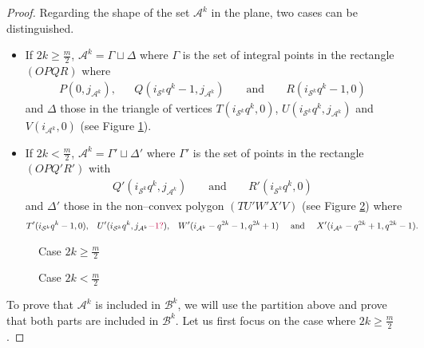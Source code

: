 \documentclass[a4paper]{article}
\newcommand{\calA}{\mathcal{A}}
\newcommand{\calB}{\mathcal{B}}
\newcommand{\calS}{\mathcal{S}}
\newcommand\jade[1]{\textcolor{purple}{#1}}
\newcommand{\modifier}[1]{\textcolor{red}{\textbf{#1}}}
\begin{document}
\begin{proof}
Regarding the shape of the set $\calA^k$ in the plane, two cases can be distinguished.
\begin{itemize}
	\item If $2k \geq \frac{m}{2}$, $\calA^k= \Gamma \sqcup \Delta$ where $\Gamma$ is the set of integral points in the rectangle $(OPQR)$ where 
	\begin{align*}
			P(0,j_{\calA^k}),&& Q(i_{\calS^k}q^k-1,j_{\calA^k})&& \text{ and }&& R(i_{\calS^k}q^k-1,0)&
	\end{align*}
 and $\Delta$ those in the triangle of vertices $T(i_{\calS^k}q^k,0)$, $U(i_{\calS^k}q^k,j_{\calA^k})$ and $V(i_{\calA^k},0)$ (see Figure \ref{fig_case_2k>=m/2}). 
	\item If $2k < \frac{m}{2}$, $\calA^k= \Gamma' \sqcup \Delta'$ where $\Gamma'$ is the set of points in the rectangle $(OPQ'R')$ with
	\begin{align*}
	Q'(i_{\calS^k}q^k,j_{\calA^k})&& \text{ and }&& R'(i_{\calS^k}q^k,0)&
	\end{align*}
and $\Delta'$ those in the non--convex polygon $(TU'W'X'V)$ (see Figure \ref{fig_case_2k<m/2}) where  
	\begin{align*}
	&T'(i_{\calS^k}q^k-1,0),&& U'(i_{\calS^k}q^k,j_{\calA^k}\jade{-1?}),&&W'(i_{\calA^k}-q^{2k}-1,q^{2k}+1)&& \text{ and } &&X'(i_{\calA^k}-q^{2k}+1,q^{2k}-1).
\end{align*}

 
\end{itemize}


\vspace*{0.3cm}
\begin{figure}[ht] 
	\centering
	\scalebox{0.9}{
	}
	\caption{Case $2k \geq \frac{m}{2}$} \label{fig_case_2k>=m/2}
\end{figure}
\begin{figure}[ht] 
	\centering
	\scalebox{0.9}{
	}
	\caption{Case $2k < \frac{m}{2}$} \label{fig_case_2k<m/2}
\end{figure}

 To prove that $\calA^k$ is included in $\calB^k$, we will use the partition above and prove that both parts are included in $\calB^k$. Let us first focus on the case where $2k \geq \frac{m}{2}$.





\end{proof}
\end{document}

